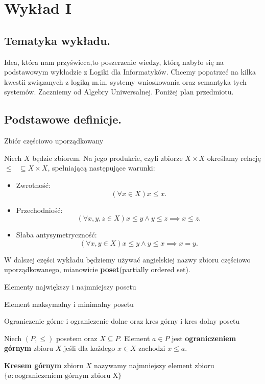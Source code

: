 \section{Wykład I}
\subsection{Tematyka wykładu.}

Idea, która nam przyświeca,to poszerzenie wiedzy, którą nabyło się na podstawowym wykładzie z Logiki dla Informatyków. Chcemy popatrzeć na kilka kwestii związanych z logiką m.in. systemy wnioskowania oraz semantyka tych systemów. Zaczniemy od Algebry Uniwersalnej. Poniżej plan przedmiotu.

\subsection{Podstawowe definicje.}

\begin{definition}{Zbiór częściowo uporządkowany}

	Niech $X$ będzie zbiorem. Na jego produkcie, czyli zbiorze $X \times X$ określamy relację $\le\text{ }\subseteq X\times X$, spełniającą następujące warunki:
	\begin{itemize}
		\item Zwrotność:
			\[
			\left( \forall x\in X \right) x \le x 
			.\] 
		\item Przechodniość:
			\[
			\left( \forall x,y,z \in X \right) x\le y \land y \le  z \implies x \le z  
			.\] 
		\item Słaba antysymetryczność:
			\[
			\left( \forall x,y\in X \right) x\le y \land y\le x \implies x = y 
			.\] 
	\end{itemize}
\end{definition}

W dalszej części wykładu będziemy używać angielskiej nazwy zbioru częściowo uporządkowanego, mianowicie \textbf{poset}(partially ordered set).

\begin{definition}{Elementy największy i najmniejszy posetu}
	

\end{definition}

\begin{definition}{Element maksymalny i minimalny posetu}
	

\end{definition}

\begin{definition}{Ograniczenie górne i ograniczenie dolne oraz kres górny i kres dolny posetu}
	
	Niech $\left( P, \le  \right) $ posetem oraz $X\subseteq P$. Element $a \in P$ jest \textbf{ograniczeniem górnym}  zbioru $X$ jeśli dla każdego $x \in  X$ zachodzi $x \le a$. 

	\textbf{Kresem górnym} zbioru $X$ nazywamy najmniejszy element zbioru $\{a : a \text{ograniczeniem górnym zbioru X}\} $
\end{definition}


